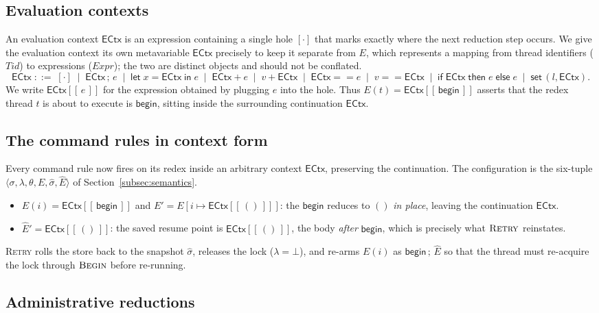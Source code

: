 \documentclass[manuscript,nonacm]{acmart}
\theoremstyle{acmdefinition}
\newcommand{\unit}{()}
\newcommand{\bbegin}{\textsf{begin}}
\newcommand{\setc}[2]{\textsf{set}\,(#1,#2)}
\newcommand{\ectx}{\mathsf{ECtx}}
\newcommand{\ehole}[1]{\ectx[[\, #1 \,]]}
\begin{document}
\subsection{Evaluation contexts}

An evaluation context $\ectx$ is an expression containing a single
hole $[\cdot]$ that marks exactly where the next reduction step occurs. We give
the evaluation context its own metavariable $\ectx$ precisely to keep it
separate from $E$, which represents a mapping from thread identifiers
($\mathit{Tid}$) to expressions ($\mathit{Expr}$); the two are distinct objects
and should not be conflated.
\[
\ectx \;::=\; [\cdot]
\;\mid\; \ectx\,;\,e
\;\mid\; \textsf{let}\;x = \ectx\;\textsf{in}\;e
\;\mid\; \ectx + e \;\mid\; v + \ectx
\;\mid\; \ectx == e \;\mid\; v == \ectx
\;\mid\; \textsf{if}\;\ectx\;\textsf{then}\;e\;\textsf{else}\;e
\;\mid\; \setc{l}{\ectx}.
\]
We write $\ehole{e}$ for the expression obtained by plugging $e$ into the hole. Thus
$E(t)=\ehole{\bbegin}$ asserts that the redex thread $t$ is about to execute is
$\bbegin$, sitting inside the surrounding continuation $\ectx$.

\subsection{The command rules in context form}

Every command rule now fires on its redex inside an arbitrary context $\ectx$,
preserving the continuation. The configuration is the six-tuple
$\langle\sigma,\lambda,\theta,E,\hat{\sigma},\hat{E}\rangle$ of
Section~\ref{subsec:semantics}.

\begin{itemize}
\item $E(i)=\ehole{\bbegin}$ and $E'=E[i\mapsto \ehole{\unit}]$: the $\bbegin$ reduces to
$\unit$ \emph{in place}, leaving the continuation $\ectx$.
\item $\hat{E}'=\ehole{\unit}$: the saved resume point is $\ehole{\unit}$,
the body \emph{after} $\bbegin$, which is precisely what $\textsc{Retry}$
reinstates.
\end{itemize}
\textsc{Retry} rolls the store back to
the snapshot $\hat{\sigma}$, releases the lock ($\lambda = \bot$), and
re-arms $E(i)$ as $\bbegin\,;\,\hat{E}$ so that the thread must re-acquire the
lock through $\textsc{Begin}$ before re-running.

\subsection{Administrative reductions}
\end{document}
